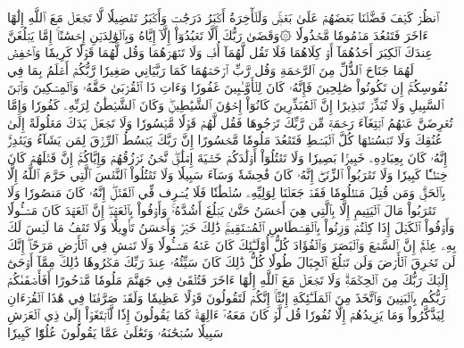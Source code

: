 ٱنظُرۡ كَيۡفَ فَضَّلۡنَا بَعۡضَهُمۡ عَلَىٰ بَعۡضٖۚ وَلَلۡأٓخِرَةُ أَكۡبَرُ دَرَجَٰتٖ وَأَكۡبَرُ تَفۡضِيلٗا
لَّا تَجۡعَلۡ مَعَ ٱللَّهِ إِلَٰهًا ءَاخَرَ فَتَقۡعُدَ مَذۡمُومٗا مَّخۡذُولٗا
۞وَقَضَىٰ رَبُّكَ أَلَّا تَعۡبُدُوٓاْ إِلَّآ إِيَّاهُ وَبِٱلۡوَٰلِدَيۡنِ إِحۡسَٰنًاۚ إِمَّا يَبۡلُغَنَّ عِندَكَ ٱلۡكِبَرَ أَحَدُهُمَآ أَوۡ كِلَاهُمَا فَلَا تَقُل لَّهُمَآ أُفّٖ وَلَا تَنۡهَرۡهُمَا وَقُل لَّهُمَا قَوۡلٗا كَرِيمٗا
وَٱخۡفِضۡ لَهُمَا جَنَاحَ ٱلذُّلِّ مِنَ ٱلرَّحۡمَةِ وَقُل رَّبِّ ٱرۡحَمۡهُمَا كَمَا رَبَّيَانِي صَغِيرٗا
رَّبُّكُمۡ أَعۡلَمُ بِمَا فِي نُفُوسِكُمۡۚ إِن تَكُونُواْ صَٰلِحِينَ فَإِنَّهُۥ كَانَ لِلۡأَوَّـٰبِينَ غَفُورٗا
وَءَاتِ ذَا ٱلۡقُرۡبَىٰ حَقَّهُۥ وَٱلۡمِسۡكِينَ وَٱبۡنَ ٱلسَّبِيلِ وَلَا تُبَذِّرۡ تَبۡذِيرًا
إِنَّ ٱلۡمُبَذِّرِينَ كَانُوٓاْ إِخۡوَٰنَ ٱلشَّيَٰطِينِۖ وَكَانَ ٱلشَّيۡطَٰنُ لِرَبِّهِۦ كَفُورٗا
وَإِمَّا تُعۡرِضَنَّ عَنۡهُمُ ٱبۡتِغَآءَ رَحۡمَةٖ مِّن رَّبِّكَ تَرۡجُوهَا فَقُل لَّهُمۡ قَوۡلٗا مَّيۡسُورٗا
وَلَا تَجۡعَلۡ يَدَكَ مَغۡلُولَةً إِلَىٰ عُنُقِكَ وَلَا تَبۡسُطۡهَا كُلَّ ٱلۡبَسۡطِ فَتَقۡعُدَ مَلُومٗا مَّحۡسُورًا
إِنَّ رَبَّكَ يَبۡسُطُ ٱلرِّزۡقَ لِمَن يَشَآءُ وَيَقۡدِرُۚ إِنَّهُۥ كَانَ بِعِبَادِهِۦ خَبِيرَۢا بَصِيرٗا
وَلَا تَقۡتُلُوٓاْ أَوۡلَٰدَكُمۡ خَشۡيَةَ إِمۡلَٰقٖۖ نَّحۡنُ نَرۡزُقُهُمۡ وَإِيَّاكُمۡۚ إِنَّ قَتۡلَهُمۡ كَانَ خِطۡـٔٗا كَبِيرٗا
وَلَا تَقۡرَبُواْ ٱلزِّنَىٰٓۖ إِنَّهُۥ كَانَ فَٰحِشَةٗ وَسَآءَ سَبِيلٗا
وَلَا تَقۡتُلُواْ ٱلنَّفۡسَ ٱلَّتِي حَرَّمَ ٱللَّهُ إِلَّا بِٱلۡحَقِّۗ وَمَن قُتِلَ مَظۡلُومٗا فَقَدۡ جَعَلۡنَا لِوَلِيِّهِۦ سُلۡطَٰنٗا فَلَا يُسۡرِف فِّي ٱلۡقَتۡلِۖ إِنَّهُۥ كَانَ مَنصُورٗا
وَلَا تَقۡرَبُواْ مَالَ ٱلۡيَتِيمِ إِلَّا بِٱلَّتِي هِيَ أَحۡسَنُ حَتَّىٰ يَبۡلُغَ أَشُدَّهُۥۚ وَأَوۡفُواْ بِٱلۡعَهۡدِۖ إِنَّ ٱلۡعَهۡدَ كَانَ مَسۡـُٔولٗا
وَأَوۡفُواْ ٱلۡكَيۡلَ إِذَا كِلۡتُمۡ وَزِنُواْ بِٱلۡقِسۡطَاسِ ٱلۡمُسۡتَقِيمِۚ ذَٰلِكَ خَيۡرٞ وَأَحۡسَنُ تَأۡوِيلٗا
وَلَا تَقۡفُ مَا لَيۡسَ لَكَ بِهِۦ عِلۡمٌۚ إِنَّ ٱلسَّمۡعَ وَٱلۡبَصَرَ وَٱلۡفُؤَادَ كُلُّ أُوْلَـٰٓئِكَ كَانَ عَنۡهُ مَسۡـُٔولٗا
وَلَا تَمۡشِ فِي ٱلۡأَرۡضِ مَرَحًاۖ إِنَّكَ لَن تَخۡرِقَ ٱلۡأَرۡضَ وَلَن تَبۡلُغَ ٱلۡجِبَالَ طُولٗا
كُلُّ ذَٰلِكَ كَانَ سَيِّئُهُۥ عِندَ رَبِّكَ مَكۡرُوهٗا
ذَٰلِكَ مِمَّآ أَوۡحَىٰٓ إِلَيۡكَ رَبُّكَ مِنَ ٱلۡحِكۡمَةِۗ وَلَا تَجۡعَلۡ مَعَ ٱللَّهِ إِلَٰهًا ءَاخَرَ فَتُلۡقَىٰ فِي جَهَنَّمَ مَلُومٗا مَّدۡحُورًا
أَفَأَصۡفَىٰكُمۡ رَبُّكُم بِٱلۡبَنِينَ وَٱتَّخَذَ مِنَ ٱلۡمَلَـٰٓئِكَةِ إِنَٰثًاۚ إِنَّكُمۡ لَتَقُولُونَ قَوۡلًا عَظِيمٗا
وَلَقَدۡ صَرَّفۡنَا فِي هَٰذَا ٱلۡقُرۡءَانِ لِيَذَّكَّرُواْ وَمَا يَزِيدُهُمۡ إِلَّا نُفُورٗا
قُل لَّوۡ كَانَ مَعَهُۥٓ ءَالِهَةٞ كَمَا يَقُولُونَ إِذٗا لَّٱبۡتَغَوۡاْ إِلَىٰ ذِي ٱلۡعَرۡشِ سَبِيلٗا
سُبۡحَٰنَهُۥ وَتَعَٰلَىٰ عَمَّا يَقُولُونَ عُلُوّٗا كَبِيرٗا
